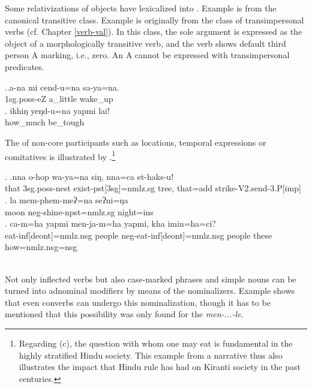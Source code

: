 Some  relativizations of objects have lexicalized into . Example \Next[a] is from the canonical transitive class. Example \Next[b] is originally from the class of transimpersonal verbs (cf. Chapter \ref{verb-val}). In this class, the sole argument is expressed as the object of a morphologically transitive verb, and the verb shows default third person A marking, i.e., zero. An A cannot be expressed with transimpersonal predicates.
\largerpage

\ex.\ag.a-na mi cend-u=na sa-ya=na.\\
{\sc 1sg.poss-}eZ  a\_little wake\_up \\
\bg. ikhiŋ yeŋd-u=na yapmi lai!\\
how\_much be\_tough  \\


The  of non-core participants such as locations, temporal expressions or comitatives is illustrated by \Next.\footnote{Regarding (c), the question with whom one may eat is fundamental in the highly stratified Hindu society. This example from a narrative thus also illustrates the impact that Hindu rule has had on Kiranti society in the past centuries.} 	
 
 
\ex. \ag.nna  o-hop wa-ya=na siŋ, nna=ca  et-haks-u!\\
		that {\sc 3sg.poss}-nest exist-{\sc pst[3sg]=nmlz.sg} tree, that{\sc =add} strike-{\sc V2.send-3.P[imp]}\\
	  
 	\bg. la   mem-phem-meʔ=na   seʔni=ŋa\\
	moon {\sc neg}-shine{\sc -npst=nmlz.sg} night{\sc =ins} 		\\
	 
	\bg. {ca-m}=ha  yapmi  men-ja-m=ha yapmi,  kha   imin=ha=ci?\\
	eat-{\sc inf[deont]=nmlz.nsg} people {\sc neg}-eat-{\sc inf[deont]=nmlz.nsg} people these how{\sc =nmlz.nsg=nsg} 		\\
	\\ 

	
Not only inflected verbs but also case-marked phrases \Next and simple nouns \NNext[a] can be turned into adnominal modifiers by means of the nominalizers. Example \NNext[b] shows that even converbs can undergo this nominalization, though it has to be mentioned that this possibility was only found for the   \emph{men-...-le}.
\largerpage


